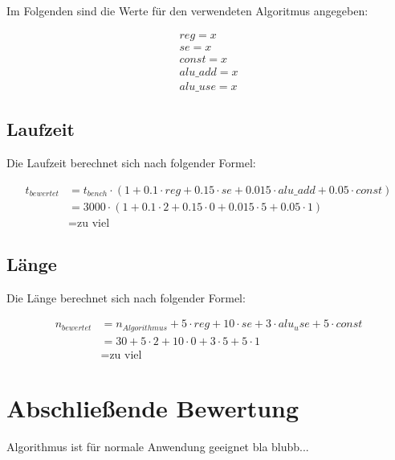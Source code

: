 
Im Folgenden sind die Werte für den verwendeten Algoritmus angegeben:

\begin{eqnarray*}
    reg = x \\
    se = x \\
    const = x \\
    alu\_add = x \\
    alu\_use = x
\end{eqnarray*}

\subsection{Laufzeit}
\label{subsection:Dokumentation-BenchmarkBewertung-Berechnung-Laufzeit}

Die Laufzeit berechnet sich nach folgender Formel:

\begin{align*}
    t_{bewertet} &= t_{bench} \cdot (1 + 0.1 \cdot reg + 0.15 \cdot se + 0.015 \cdot alu\_add + 0.05 \cdot const) \\
                 &= 3000 \cdot (1 + 0.1 \cdot 2 + 0.15 \cdot 0 + 0.015 \cdot 5 + 0.05 \cdot 1) \\
                 &= \mbox{zu viel}
\end{align*}

\subsection{Länge}
\label{subsection:Dokumentation-BenchmarkBewertung-Berechnung-Laenge}

Die Länge berechnet sich nach folgender Formel:

\begin{align*}
    n_{bewertet} &= n_{Algorithmus} + 5 \cdot reg + 10 \cdot se + 3 \cdot alu_use + 5 \cdot const \\
                 &= 30 + 5 \cdot 2 + 10 \cdot 0 + 3 \cdot 5 + 5 \cdot 1 \\
                 &= \mbox{zu viel}
\end{align*}

\section{Abschließende Bewertung}
\label{section:Dokumentation-BenchmarkBewertung-Bewertung}

Algorithmus ist für normale Anwendung geeignet bla blubb... 
